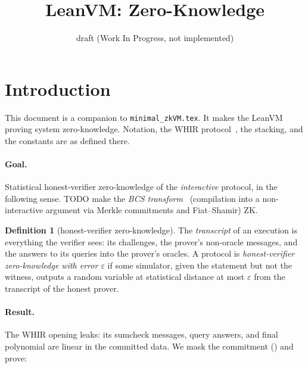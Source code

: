 \documentclass{article}
\title{LeanVM: Zero-Knowledge}
\author{draft (Work In Progress, not implemented)}
\date{}
\theoremstyle{definition}
\newtheorem{definition}[theorem]{Definition}
\begin{document}
\maketitle

\section{Introduction}

This document is a companion to \texttt{minimal\_zkVM.tex}. It makes the LeanVM proving system zero-knowledge. Notation, the WHIR protocol~\cite{whir}, the stacking, and the constants are as defined there.

\paragraph{Goal.} Statistical honest-verifier zero-knowledge of the \emph{interactive} protocol, in the following sense. TODO make the \emph{BCS transform}~\cite{BCS} (compilation into a non-interactive argument via Merkle commitments and Fiat--Shamir) ZK.

\begin{definition}[honest-verifier zero-knowledge]\label{def:hvzk}
The \emph{transcript} of an execution is everything the verifier sees: its challenges, the prover's non-oracle messages, and the answers to its queries into the prover's oracles. A protocol is \emph{honest-verifier zero-knowledge with error $\varepsilon$} if some simulator, given the statement but not the witness, outputs a random variable at statistical distance at most $\varepsilon$ from the transcript of the honest prover.
\end{definition}

\paragraph{Result.} The WHIR opening leaks: its sumcheck messages, query answers, and final polynomial are linear in the committed data. We mask the commitment () and prove:
\end{document}
